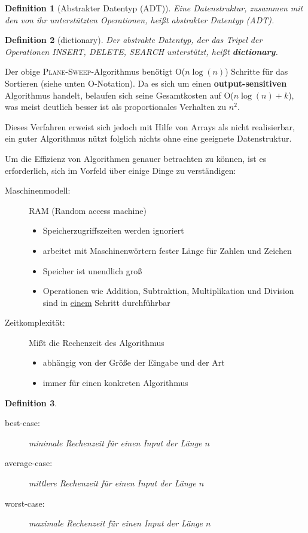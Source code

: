 \documentclass[ngerman,draft,parskip=half*,twoside]{scrreprt}
\theoremstyle{break}
\newtheorem{definition}{Definition}
\begin{document}
\begin{definition}[Abstrakter Datentyp (ADT)]
  Eine Datenstruktur, zusammen mit den von ihr unterstützten Operationen, 
  heißt abstrakter Datentyp (ADT).
\end{definition}

\begin{definition}[dictionary]
  Der abstrakte Datentyp, der das Tripel der Operationen \textit{INSERT},
  \textit{DELETE}, \textit{SEARCH} unterstützt, heißt \textbf{dictionary}.
\end{definition}

Der obige \textsc{Plane-Sweep}-Algorithmus benötigt O($n\log(n)$) Schritte
für das Sortieren (siehe unten O-Notation). Da es sich um einen \textbf{output-sensitiven}
Algorithmus handelt, belaufen sich seine Gesamtkosten auf
O($n\log(n)+k$), was meist deutlich besser ist als proportionales Verhalten
zu $n^2$.

Dieses Verfahren erweist sich jedoch mit Hilfe von Arrays als nicht
realisierbar, ein guter Algorithmus nützt folglich nichts ohne eine
geeignete Datenstruktur.

Um die Effizienz von Algorithmen genauer betrachten zu können, ist es
erforderlich, sich im Vorfeld über einige Dinge zu verständigen:

\begin{description}
 \item[Maschinenmodell:] RAM (Random access machine)
  \begin{itemize}
   \item Speicherzugriffszeiten werden ignoriert
   \item arbeitet mit Maschinenwörtern fester Länge für Zahlen und Zeichen
   \item Speicher ist unendlich groß
   \item Operationen wie Addition, Subtraktion, Multiplikation und Division
    sind in \underline{einem} Schritt durchführbar
  \end{itemize}
 \item[Zeitkomplexität:] Mißt die Rechenzeit des Algorithmus
  \begin{itemize}
   \item{abhängig von der Größe der Eingabe und der Art}
   \item{immer für einen konkreten Algorithmus}
  \end{itemize}
\end{description}

\begin{definition}
  \begin{description}
   \item[best-case:] minimale Rechenzeit für einen Input der Länge $n$
   \item[average-case:] mittlere Rechenzeit für einen Input der Länge $n$
   \item[worst-case:] maximale Rechenzeit für einen Input der Länge $n$
  \end{description}
\end{definition}
\end{document}
